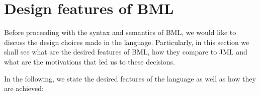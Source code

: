 \section{Design features of BML}\label{BML:design}
Before proceeding with the syntax and semantics 
of BML, we would like to discuss the design choices
 made in the language. Particularly, in this section 
we shall see what are the desired features of BML, 
how  they compare to JML and what  are the motivations that led us to these decisions. 


In the following, we state the desired features of the language as well 
as how they are achieved:

